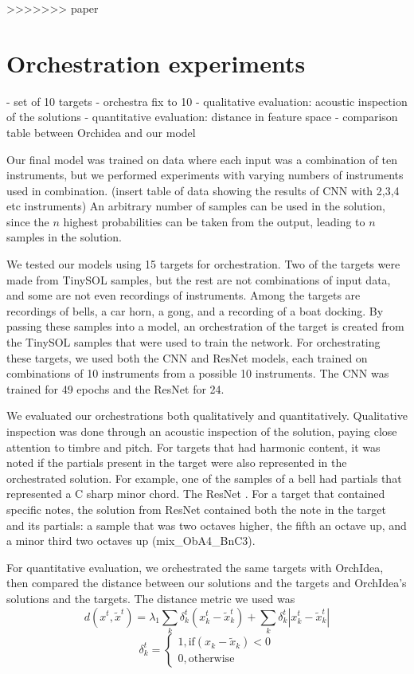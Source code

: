 \documentclass{article}
\begin{document}
>>>>>>> paper
\section{Orchestration experiments}
- set of 10 targets
- orchestra fix to 10
- qualitative evaluation: acoustic inspection of the solutions
- quantitative evaluation: distance in feature space
- comparison table between Orchidea and our model

Our final model was trained on data where each input was a combination of ten instruments, but we performed experiments with varying numbers of instruments used in combination. (insert table of data showing the results of CNN with 2,3,4 etc instruments) An arbitrary number of samples can be used in the solution, since the $n$ highest probabilities can be taken from the output, leading to $n$ samples in the solution.

We tested our models using 15 targets for orchestration. Two of the targets were made from TinySOL samples, but the rest are not combinations of input data, and some are not even recordings of instruments. Among the targets are recordings of bells, a car horn, a gong, and a recording of a boat docking. By passing these samples into a model, an orchestration of the target is created from the TinySOL samples that were used to train the network. For orchestrating these targets, we used both the CNN and ResNet models, each trained on combinations of 10 instruments from a possible 10 instruments. The CNN was trained for 49 epochs and the ResNet for 24.

We evaluated our orchestrations both qualitatively and quantitatively. Qualitative inspection was done through an acoustic inspection of the solution, paying close attention to timbre and pitch. For targets that had harmonic content, it was noted if the partials present in the target were also represented in the orchestrated solution. For example, one of the samples of a bell had partials that represented a C sharp minor chord. The ResNet . For a target that contained specific notes, the solution from ResNet contained both the note in the target and its partials: a sample that was two octaves higher, the fifth an octave up, and a minor third two octaves up (mix\_ObA4\_BnC3).

For quantitative evaluation, we orchestrated the same targets with OrchIdea, then compared the distance between our solutions and the targets and OrchIdea's solutions and the targets. The distance metric we used was 
$$d(x^t, \tilde{x}^t) =\lambda_1 \sum_k \delta_k^t(x_k^t - \tilde{x	}_k^t) + \sum_k \delta_k^t|x_k^t - \tilde{x	}_k^t|$$
$$\delta_k^t = 
\begin{cases}
1, \text{if} (x_k - \tilde{x}_k) < 0 \\
0, \text{otherwise}
\end{cases} $$
\end{document}
